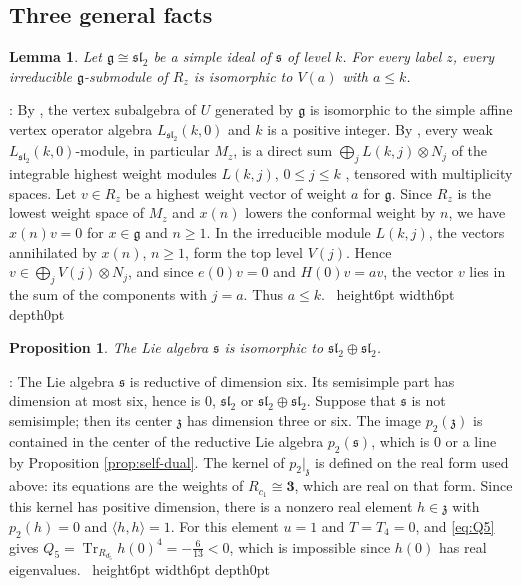\documentclass[leqno]{article}
\renewcommand{\leq}{\ensuremath{\leqslant}}
\renewcommand{\geq}{\ensuremath{\geqslant}}
\newcommand{\qed}{\hfill \vrule height6pt  width6pt depth0pt}
\newcommand{\ot}{\otimes}
\newtheorem{prop}[thm]{Proposition}
\newtheorem{lemma}[thm]{Lemma}
\newenvironment{proof}[1][]{\noindent {\it Proof #1} : }{\hbox{~}\qed
\smallskip
}
\numberwithin{equation}{section}
\begin{document}
\subsection{Three general facts}

\begin{lemma}
\label{lem:level-bound}
Let $\mathfrak g \cong \mathfrak{sl}_2$ be a simple ideal of $\mathfrak s$ of level $k$. For every label $z$, every irreducible $\mathfrak g$-submodule of $R_z$ is isomorphic to $V(a)$ with $a \leq k$.
\end{lemma}

\begin{proof}
By \cite[Theorem 3.1 p.~4]{DoM06}, the vertex subalgebra of $U$ generated by $\mathfrak g$ is isomorphic to the simple affine vertex operator algebra $L_{\mathfrak{sl}_2}(k,0)$ and $k$ is a positive integer. By \cite[Theorem 3.7 p.~7]{DLM97}, every weak $L_{\mathfrak{sl}_2}(k,0)$-module, in particular $M_z$, is a direct sum $\bigoplus_j L(k,j) \ot N_j$ of the integrable highest weight modules $L(k,j)$, $0 \leq j \leq k$ \cite{FrZ92}, tensored with multiplicity spaces. Let $v \in R_z$ be a highest weight vector of weight $a$ for $\mathfrak g$. Since $R_z$ is the lowest weight space of $M_z$ and $x(n)$ lowers the conformal weight by $n$, we have $x(n)v = 0$ for $x \in \mathfrak g$ and $n \geq 1$. In the irreducible module $L(k,j)$, the vectors annihilated by $x(n)$, $n \geq 1$, form the top level $V(j)$. Hence $v \in \bigoplus_j V(j) \ot N_j$, and since $e(0)v = 0$ and $H(0)v = av$, the vector $v$ lies in the sum of the components with $j = a$. Thus $a \leq k$.
\end{proof}

\begin{prop}
\label{prop:semisimple}
The Lie algebra $\mathfrak s$ is isomorphic to $\mathfrak{sl}_2 \oplus \mathfrak{sl}_2$.
\end{prop}

\begin{proof}
The Lie algebra $\mathfrak s$ is reductive of dimension six. Its semisimple part has dimension at most six, hence is $0$, $\mathfrak{sl}_2$ or $\mathfrak{sl}_2 \oplus \mathfrak{sl}_2$. Suppose that $\mathfrak s$ is not semisimple; then its center $\mathfrak z$ has dimension three or six. The image $p_2(\mathfrak z)$ is contained in the center of the reductive Lie algebra $p_2(\mathfrak s)$, which is $0$ or a line by Proposition \ref{prop:self-dual}. The kernel of $p_2|_{\mathfrak z}$ is defined on the real form used above: its equations are the weights of $R_{c_1} \cong \mathbf3$, which are real on that form. Since this kernel has positive dimension, there is a nonzero real element $h \in \mathfrak z$ with $p_2(h) = 0$ and $\langle h,h\rangle = 1$. For this element $u = 1$ and $T = T_4 = 0$, and \eqref{eq:Q5} gives $Q_5 = \operatorname{Tr}_{R_{d_5}}h(0)^4 = -\frac{6}{13} < 0$, which is impossible since $h(0)$ has real eigenvalues.
\end{proof}
\end{document}
